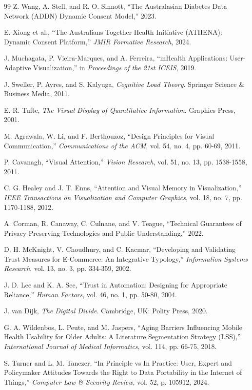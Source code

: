 \documentclass{article}
\begin{document}
\begin{thebibliography}{99}
 Z. Wang, A. Stell, and R. O. Sinnott, ``The Australasian Diabetes Data Network (ADDN) Dynamic Consent Model,'' 2023.

 E. Xiong et al., ``The Australians Together Health Initiative (ATHENA): Dynamic Consent Platform,'' \emph{JMIR Formative Research}, 2024.

 J. Muchagata, P. Vieira-Marques, and A. Ferreira, ``mHealth Applications: User-Adaptive Visualization,'' in \emph{Proceedings of the 21st ICEIS}, 2019.

 J. Sweller, P. Ayres, and S. Kalyuga, \emph{Cognitive Load Theory}. Springer Science \& Business Media, 2011.

 E. R. Tufte, \emph{The Visual Display of Quantitative Information}. Graphics Press, 2001.

 M. Agrawala, W. Li, and F. Berthouzoz, ``Design Principles for Visual Communication,'' \emph{Communications of the ACM}, vol. 54, no. 4, pp. 60-69, 2011.

 P. Cavanagh, ``Visual Attention,'' \emph{Vision Research}, vol. 51, no. 13, pp. 1538-1558, 2011.

 C. G. Healey and J. T. Enns, ``Attention and Visual Memory in Visualization,'' \emph{IEEE Transactions on Visualization and Computer Graphics}, vol. 18, no. 7, pp. 1170-1188, 2012.

 A. Corman, R. Canaway, C. Culnane, and V. Teague, ``Technical Guarantees of Privacy-Preserving Technologies and Public Understanding,'' 2022.

 D. H. McKnight, V. Choudhury, and C. Kacmar, ``Developing and Validating Trust Measures for E-Commerce: An Integrative Typology,'' \emph{Information Systems Research}, vol. 13, no. 3, pp. 334-359, 2002.

 J. D. Lee and K. A. See, ``Trust in Automation: Designing for Appropriate Reliance,'' \emph{Human Factors}, vol. 46, no. 1, pp. 50-80, 2004.

 J. van Dijk, \emph{The Digital Divide}. Cambridge, UK: Polity Press, 2020.

 G. A. Wildenbos, L. Peute, and M. Jaspers, ``Aging Barriers Influencing Mobile Health Usability for Older Adults: A Literature Segmentation Strategy (LSS),'' \emph{International Journal of Medical Informatics}, vol. 114, pp. 66-75, 2018.

 S. Turner and L. M. Tanczer, ``In Principle vs In Practice: User, Expert and Policymaker Attitudes Towards the Right to Data Portability in the Internet of Things,'' \emph{Computer Law \& Security Review}, vol. 52, p. 105912, 2024.


\end{thebibliography}
\end{document}
